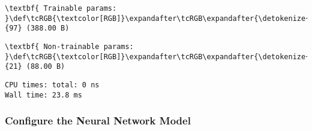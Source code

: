 \documentclass[11pt]{article}
\begin{document}
    
    
    \begin{Verbatim}[commandchars=\\\{\}]
\textbf{ Trainable params: }\def\tcRGB{\textcolor[RGB]}\expandafter\tcRGB\expandafter{\detokenize{0,175,0}}{97} (388.00 B)

    \end{Verbatim}

    
    
    \begin{Verbatim}[commandchars=\\\{\}]
\textbf{ Non-trainable params: }\def\tcRGB{\textcolor[RGB]}\expandafter\tcRGB\expandafter{\detokenize{0,175,0}}{21} (88.00 B)

    \end{Verbatim}

    
    \begin{Verbatim}[commandchars=\\\{\}]
CPU times: total: 0 ns
Wall time: 23.8 ms
    \end{Verbatim}

    \subsubsection{Configure the Neural Network
Model}\label{configure-the-neural-network-model}
\end{document}
